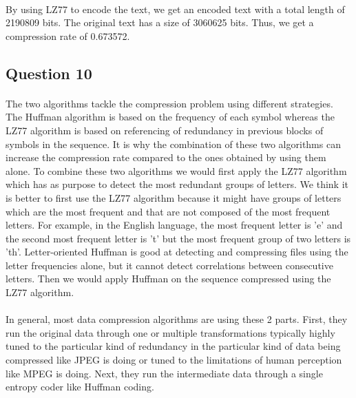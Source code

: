 \documentclass[a4paper, 11pt, oneside]{article}
\begin{document}
\paragraph{}By using LZ77 to encode the text, we get an encoded text with a total length of 2190809 bits.
The original text has a size of 3060625 bits. Thus, we get a compression rate of 0.673572.


\subsection{Question 10}
\paragraph{}The two algorithms tackle the compression problem using different strategies. The Huffman 
algorithm is based on the frequency of each symbol whereas the LZ77 algorithm is based on referencing of 
redundancy in previous blocks of symbols in the sequence. It is why the combination of these two algorithms can increase the compression rate compared to the ones obtained by using them alone.
To combine these two algorithms we would first apply the LZ77 algorithm which has as purpose to detect the most redundant groups of letters. We think it is better to first
use the LZ77 algorithm because it might have groups of letters which are the most frequent and that are not composed of the most frequent letters. For example, in the English language, the 
most frequent letter is 'e' and the second most frequent letter is 't' but the most frequent group of two letters is 'th'. Letter-oriented Huffman is good at detecting and compressing files using the letter frequencies alone, but it cannot detect correlations between consecutive letters.
Then we would apply Huffman on the sequence compressed using the LZ77 algorithm. 

\paragraph{}In general, most data compression algorithms are using these 2 parts. First, they run the original data through one or multiple transformations typically highly tuned to the particular kind of redundancy in the particular kind of data being compressed like JPEG is doing or tuned to the limitations of human perception like MPEG is doing. Next, they run the intermediate data through a single entropy coder like Huffman coding.
\end{document}
